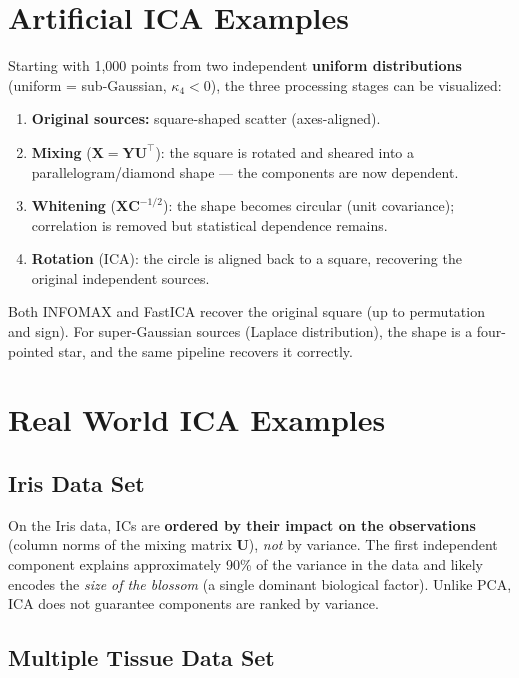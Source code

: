 \documentclass[11pt, oneside]{book}
\newcommand{\T}{^{\top}}
\begin{document}
\section{Artificial ICA Examples}

Starting with 1{,}000 points from two independent \textbf{uniform distributions}
(uniform = sub-Gaussian, $\kappa_4 < 0$), the three processing stages can be visualized:

\begin{enumerate}
  \item \textbf{Original sources:} square-shaped scatter (axes-aligned).
  \item \textbf{Mixing} ($\bm{X} = \bm{Y}\bm{U}\T$): the square is rotated and sheared
        into a parallelogram/diamond shape --- the components are now dependent.
  \item \textbf{Whitening} ($\bm{X}\bm{C}^{-1/2}$): the shape becomes circular
        (unit covariance); correlation is removed but statistical dependence remains.
  \item \textbf{Rotation} (ICA): the circle is aligned back to a square, recovering
        the original independent sources.
\end{enumerate}

Both INFOMAX and FastICA recover the original square (up to permutation and sign).
For super-Gaussian sources (Laplace distribution), the shape is a four-pointed star,
and the same pipeline recovers it correctly.


\section{Real World ICA Examples}

\subsection{Iris Data Set}

On the Iris data, ICs are \textbf{ordered by their impact on the observations}
(column norms of the mixing matrix $\bm{U}$), \emph{not} by variance.
The first independent component explains approximately 90\% of the variance in the
data and likely encodes the \emph{size of the blossom} (a single dominant biological
factor).
Unlike PCA, ICA does not guarantee components are ranked by variance.

\subsection{Multiple Tissue Data Set}
\end{document}
